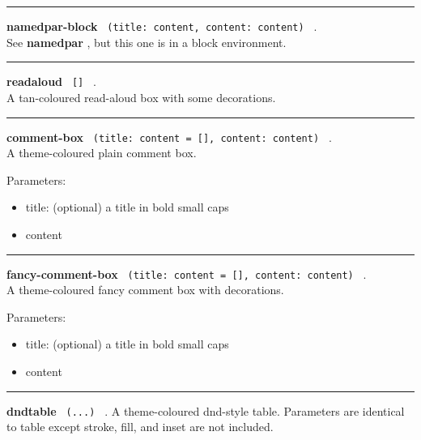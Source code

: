 \begin{center}\rule{0.5\linewidth}{0.5pt}\end{center}

\textbf{namedpar-block}
\texttt{\ (title:\ content,\ content:\ content)\ } .\\
See \textbf{namedpar} , but this one is in a block environment.

\begin{center}\rule{0.5\linewidth}{0.5pt}\end{center}

\textbf{readaloud} \texttt{\ {[}{]}\ } .\\
A tan-coloured read-aloud box with some decorations.

\begin{center}\rule{0.5\linewidth}{0.5pt}\end{center}

\textbf{comment-box}
\texttt{\ (title:\ content\ =\ {[}{]},\ content:\ content)\ } .\\
A theme-coloured plain comment box.

Parameters:

\begin{itemize}
\tightlist
\item
  title: (optional) a title in bold small caps
\item
  content
\end{itemize}

\begin{center}\rule{0.5\linewidth}{0.5pt}\end{center}

\textbf{fancy-comment-box}
\texttt{\ (title:\ content\ =\ {[}{]},\ content:\ content)\ } .\\
A theme-coloured fancy comment box with decorations.

Parameters:

\begin{itemize}
\tightlist
\item
  title: (optional) a title in bold small caps
\item
  content
\end{itemize}

\begin{center}\rule{0.5\linewidth}{0.5pt}\end{center}

\textbf{dndtable} \texttt{\ (...)\ } . A theme-coloured dnd-style table.
Parameters are identical to table except stroke, fill, and inset are not
included.

